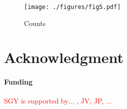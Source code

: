 \documentclass{bioinfo}
\newcommand{\col}[2][red]{\textcolor{#1}{#2}}
\begin{document}
\begin{figure}[t]
    \centerline{\texttt{[image: ./figures/fig5.pdf]}}
    \caption{Counts}\label{counts}
\end{figure}


\section*{Acknowledgment}
\paragraph{Funding\textcolon} \col[red]{SGY is supported by$\ldots$ , JV, JP, $\ldots$}

%

%

\end{document}
